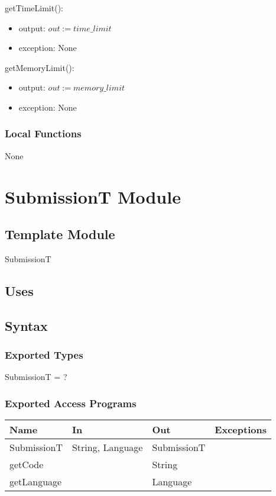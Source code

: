 \documentclass[12pt, titlepage]{article}
\begin{document}
\noindent getTimeLimit():
\begin{itemize}
\item output: $out := time\_limit$
\item exception: None
\end{itemize}

\noindent getMemoryLimit():
\begin{itemize}
\item output: $out := memory\_limit$
\item exception: None
\end{itemize}

\subsubsection{Local Functions}
None


\newpage

\section{SubmissionT Module} \label{SubmissionT} 

\subsection{Template Module}

SubmissionT

\subsection{Uses}


\subsection{Syntax}

\subsubsection{Exported Types}

SubmissionT = ?

\subsubsection{Exported Access Programs}

\begin{center}
\begin{tabular}{ |  p{4cm} | p{3cm} |  p{3cm} | p{4cm} | }
\hline
\textbf{Name} & \textbf{In} & \textbf{Out} & \textbf{Exceptions} \\
\hline
SubmissionT & String, Language & SubmissionT & \\
getCode & & String & \\
getLanguage & & Language & \\

\hline
\end{tabular}
\end{center}
\end{document}

